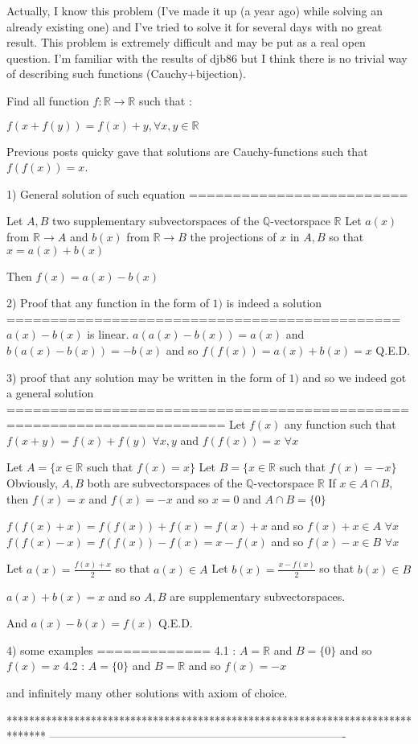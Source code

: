 \begin{solution}
	Actually, I know this problem (I've made it up (a year ago) while solving an already existing one) and I've tried to solve it for several days with no great result. This problem is extremely difficult and may be put as a real open question. I'm familiar with the results of djb86 but I think there is no trivial way of describing such functions (Cauchy+bijection).
\end{solution}



\begin{solution}
	\begin{tcolorbox}Find all function $f:\mathbb{R} \to \mathbb{R}$ such that : 

$f(x+f(y))=f(x)+y , \forall x,y \in \mathbb{R}$\end{tcolorbox}
Previous posts quicky gave that solutions are Cauchy-functions such that $f(f(x))=x$.

1) General solution of such equation 
=========================

Let $A,B$ two supplementary subvectorspaces of the $\mathbb Q$-vectorspace $\mathbb R$
Let $a(x)$ from $\mathbb R\to A$ and $b(x)$ from $\mathbb R\to B$ the projections of $x$ in $A,B$ so that $x=a(x)+b(x)$

Then $f(x)=a(x)-b(x)$ 

2) Proof that any function in the form of $1)$ is indeed a solution
=============================================
$a(x)-b(x)$ is linear.
$a(a(x)-b(x))=a(x)$ and $b(a(x)-b(x))=-b(x)$ and so $f(f(x))=a(x)+b(x)=x$
Q.E.D.

3) proof that any solution may be written in the form of $1)$ and so we indeed got a general solution
=======================================================================
Let $f(x)$ any function such that $f(x+y)=f(x)+f(y)$ $\forall x,y$ and $f(f(x))=x$ $\forall x$

Let $A=\{x\in\mathbb R$ such that $f(x)=x\}$
Let $B=\{x\in\mathbb R$ such that $f(x)=-x\}$
Obviously, $A,B$ both are subvectorspaces of the $\mathbb Q$-vectorspace $\mathbb R$
If $x\in A\cap B$, then $f(x)=x$ and $f(x)=-x$ and so $x=0$ and $A\cap B=\{0\}$

$f(f(x)+x)=f(f(x))+f(x)=f(x)+x$ and so $f(x)+x\in A$ $\forall x$
$f(f(x)-x)=f(f(x))-f(x)=x-f(x)$ and so $f(x)-x\in B$ $\forall x$

Let $a(x)=\frac{f(x)+x}2$ so that $a(x)\in A$
Let $b(x)=\frac{x-f(x)}2$ so that $b(x)\in B$

$a(x)+b(x)=x$ and so $A,B$ are supplementary subvectorspaces.

And $a(x)-b(x)=f(x)$
Q.E.D.

4) some examples
=============
4.1 : $A=\mathbb R$ and $B=\{0\}$ and so $f(x)=x$
4.2 : $A=\{0\}$ and $B=\mathbb R$ and so $f(x)=-x$

and infinitely many other solutions with axiom of choice.
\end{solution}
*******************************************************************************
-------------------------------------------------------------------------------

